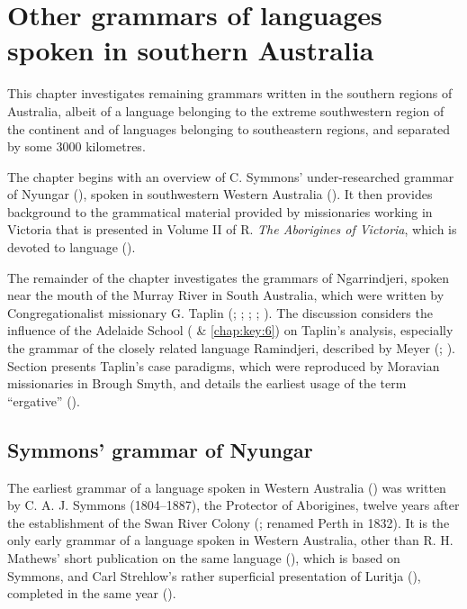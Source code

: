 \chapter{Other grammars of languages spoken in southern Australia}
\label{chap:key:7}

This chapter investigates remaining grammars written in the southern regions of Australia, albeit of a language belonging to the extreme southwestern region of the continent and of languages belonging to southeastern regions, and separated by some 3000 kilometres.

The chapter begins with an overview of C. Symmons' under-researched grammar of Nyungar (\citeyear{symmons_grammatical_1841}), spoken in southwestern Western Australia (). It then provides background to the grammatical material provided by missionaries working in Victoria that is presented in Volume II of R.  \textit{The Aborigines of Victoria}, which is devoted to language ().

The remainder of the chapter investigates the grammars of Ngarrindjeri, spoken near the mouth of the Murray River in South Australia, which were written by Congregationalist missionary G. Taplin (\citeyear{taplin_vocabulary_1867}; \citeyear{taplin_notes_1872}; \citeyear{taplin_native_1874}; \citeyear{taplin_grammar_1878}; ). The discussion considers the influence of the Adelaide School ( \& \ref{chap:key:6}) on Taplin’s analysis, especially the grammar of the closely related language Ramindjeri, described by Meyer (\citeyear{meyer_vocabulary_1843}; ). Section  presents Taplin’s case paradigms, which were reproduced by Moravian missionaries in Brough Smyth, and details the earliest usage of the term “ergative” ().

\section{Symmons' grammar of Nyungar \citeyearpar{symmons_grammatical_1841}}
\label{sec:key:7.1}\label{bkm:Ref336779457}\label{bkm:Ref74069483}

The earliest grammar of a language spoken in Western Australia (\citeyear{symmons_grammatical_1841}) was written by C. A. J. Symmons (1804–1887), the Protector of Aborigines, twelve years after the establishment of the Swan River Colony (\citeyear{symmons_grammar_1892}; renamed Perth in 1832). It is the only early grammar of a language spoken in Western Australia, other than R. H. Mathews' short publication on the same language (\citeyear{mathews_notes_1910}), which is based on Symmons, and Carl Strehlow’s rather superficial presentation of Luritja (), completed in the same year (\citeyear{mathews_notes_1910}).

